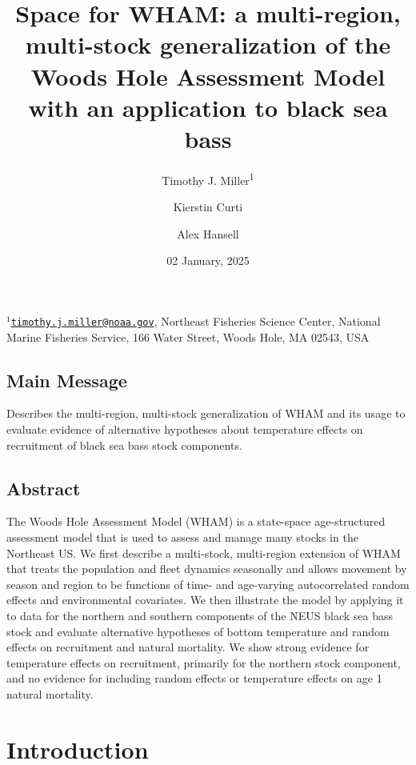 \documentclass[
]{article}
\title{Space for WHAM: a multi-region, multi-stock generalization of the
Woods Hole Assessment Model with an application to black sea bass}
\author{Timothy J. Miller\textsuperscript{1} \and Kierstin
Curti \and Alex Hansell}
\date{02 January, 2025}
\begin{document}
\maketitle

\(^1\)\href{mailto:timothy.j.miller@noaa.gov}{\nolinkurl{timothy.j.miller@noaa.gov}},
Northeast Fisheries Science Center, National Marine Fisheries Service,
166 Water Street, Woods Hole, MA 02543, USA\\

\pagebreak

\hypertarget{main-message}{%
\subsection*{Main Message}\label{main-message}}

Describes the multi-region, multi-stock generalization of WHAM and its
usage to evaluate evidence of alternative hypotheses about temperature
effects on recruitment of black sea bass stock components.

\hypertarget{abstract}{%
\subsection*{Abstract}\label{abstract}}

The Woods Hole Assessment Model (WHAM) is a state-space age-structured
assessment model that is used to assess and manage many stocks in the
Northeast US. We first describe a multi-stock, multi-region extension of
WHAM that treats the population and fleet dynamics seasonally and allows
movement by season and region to be functions of time- and age-varying
autocorrelated random effects and environmental covariates. We then
illustrate the model by applying it to data for the northern and
southern components of the NEUS black sea bass stock and evaluate
alternative hypotheses of bottom temperature and random effects on
recruitment and natural mortality. We show strong evidence for
temperature effects on recruitment, primarily for the northern stock
component, and no evidence for including random effects or temperature
effects on age 1 natural mortality.

\pagebreak

\hypertarget{introduction}{%
\section*{Introduction}\label{introduction}}
\end{document}
